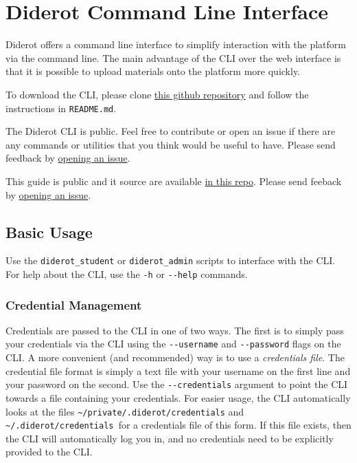 \chapter{Diderot Command Line Interface}

Diderot offers a command line interface to simplify interaction with
the platform via the command line.
%
The main advantage of the CLI over the web interface is that it is possible to upload materials onto the platform more quickly.

\begin{important}


To download the CLI, please clone 
%
\href{https://github.com/diderot-edu/diderot-cli}{this github repository}
%
and follow the instructions in \lstinline`README.md`. 

The Diderot CLI is public. Feel free to contribute or open an issue if there
are any commands or utilities that you think would be useful to have.
%
Please send feedback by 
\href{https://github.com/diderot-edu/diderot-cli/issues}{opening an issue}.

This guide is public and it source are available 
\href{https://github.com/diderot-edu/diderot-guide}{in this repo}.
%
Please send feeback by \href{https://github.com/diderot-edu/diderot-guide/issues}{opening an issue}.
\end{important}


\section{Basic Usage}

Use the \verb|diderot_student| or \verb|diderot_admin| scripts to interface with the CLI.
%
For help about the CLI, use the \verb|-h| or \verb|--help| commands.

\subsection{Credential Management}
Credentials are passed to the CLI in one of two ways. 
%
The first is to simply pass your credentials via the CLI using the \verb|--username| and \verb|--password| flags on the CLI. 
%
A more convenient (and recommended) way is to use a \emph{credentials file}.
%
The credential file format is simply a text file with your username on the first line and your password on the second. 
%
Use the \verb|--credentials| argument to point the CLI towards a file containing your credentials.
%
For easier usage, the CLI automatically looks at the files \verb|~/private/.diderot/credentials| and \verb|~/.diderot/credentials |for a credentials file of this form. 
%
If this file exists, then the CLI will automatically log you in, and no credentials need to be explicitly provided to the CLI.
%

